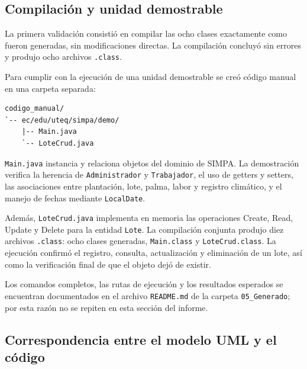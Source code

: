 \documentclass[11pt,a4paper]{article}
\begin{document}
\subsection{Compilación y unidad demostrable}

La primera validación consistió en compilar las ocho clases exactamente como fueron generadas, sin modificaciones directas. La compilación concluyó sin errores y produjo ocho archivos \texttt{.class}.

Para cumplir con la ejecución de una unidad demostrable se creó código manual en una carpeta separada:

\begin{verbatim}
codigo_manual/
`-- ec/edu/uteq/simpa/demo/
    |-- Main.java
    `-- LoteCrud.java
\end{verbatim}

\texttt{Main.java} instancia y relaciona objetos del dominio de SIMPA. La demostración verifica la herencia de \texttt{Administrador} y \texttt{Trabajador}, el uso de getters y setters, las asociaciones entre plantación, lote, palma, labor y registro climático, y el manejo de fechas mediante \texttt{LocalDate}.

Además, \texttt{LoteCrud.java} implementa en memoria las operaciones Create, Read, Update y Delete para la entidad \texttt{Lote}. La compilación conjunta produjo diez archivos \texttt{.class}: ocho clases generadas, \texttt{Main.class} y \texttt{LoteCrud.class}. La ejecución confirmó el registro, consulta, actualización y eliminación de un lote, así como la verificación final de que el objeto dejó de existir.

Los comandos completos, las rutas de ejecución y los resultados esperados se encuentran documentados en el archivo \texttt{README.md} de la carpeta \texttt{05\_Generado}; por esta razón no se repiten en esta sección del informe.

\subsection{Correspondencia entre el modelo UML y el código}
\end{document}
